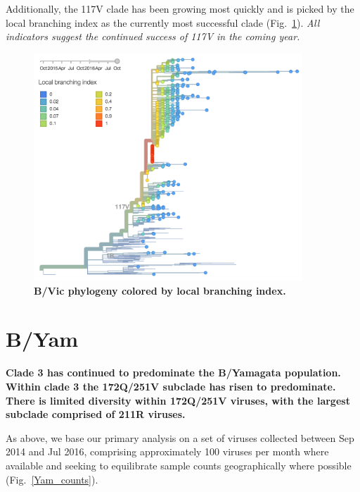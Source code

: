 \documentclass[11pt,oneside,letterpaper]{article}
\begin{document}
\pagebreak

Additionally, the 117V clade has been growing most quickly and is picked by the local branching index \cite{neher2014predicting} as the currently most successful clade (Fig.\ \ref{Vic_LBI}). \textit{All indicators suggest the continued success of 117V in the coming year.}

\begin{figure}[H]
	\centering
	\includegraphics[width=0.9\textwidth]{../figures/sep-2016/Vic_LBI.png}
	\caption{\textbf{B/Vic phylogeny colored by local branching index.}
	}
	\label{Vic_LBI}
\end{figure}

\clearpage
\pagebreak

\section*{B/Yam}

\textbf{Clade 3 has continued to predominate the B/Yamagata population. Within clade 3 the 172Q/251V subclade has risen to predominate. There is limited diversity within 172Q/251V viruses, with the largest subclade comprised of 211R viruses.}

As above, we base our primary analysis on a set of viruses collected between Sep 2014 and Jul 2016, comprising approximately 100 viruses per month where available and seeking to equilibrate sample counts geographically where possible (Fig.\ \ref{Yam_counts}).
\end{document}
